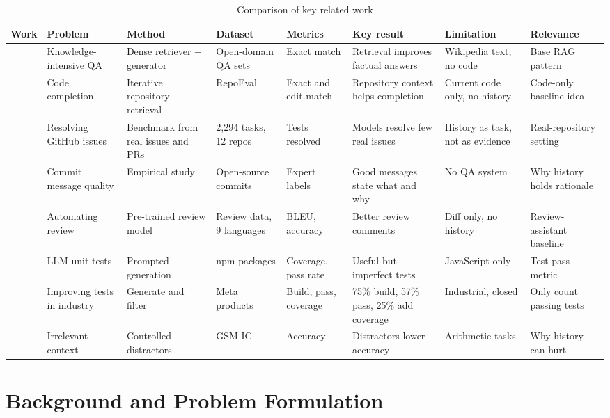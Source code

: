 \documentclass[12pt,onecolumn,draftclsnofoot]{IEEEtran}
\begin{document}
\begin{table}[!t]
\caption{Comparison of key related work}
\label{tab:related}
\centering
\scriptsize
\setlength{\tabcolsep}{3pt}
\begin{tabular}{@{}p{0.9cm}p{1.6cm}p{1.9cm}p{1.7cm}p{1.3cm}p{2.2cm}p{1.9cm}p{1.6cm}@{}}
\toprule
Work & Problem & Method & Dataset & Metrics & Key result & Limitation & Relevance \\
\midrule
\cite{lewis2020rag} & Knowledge-intensive QA & Dense retriever + generator & Open-domain QA sets & Exact match & Retrieval improves factual answers & Wikipedia text, no code & Base RAG pattern \\
\cite{zhang2023repocoder} & Code completion & Iterative repository retrieval & RepoEval & Exact and edit match & Repository context helps completion & Current code only, no history & Code-only baseline idea \\
\cite{jimenez2024swebench} & Resolving GitHub issues & Benchmark from real issues and PRs & 2{,}294 tasks, 12 repos & Tests resolved & Models resolve few real issues & History as task, not as evidence & Real-repository setting \\
\cite{tian2022commit} & Commit message quality & Empirical study & Open-source commits & Expert labels & Good messages state what and why & No QA system & Why history holds rationale \\
\cite{li2022codereviewer} & Automating review & Pre-trained review model & Review data, 9 languages & BLEU, accuracy & Better review comments & Diff only, no history & Review-assistant baseline \\
\cite{schafer2024testpilot} & LLM unit tests & Prompted generation & npm packages & Coverage, pass rate & Useful but imperfect tests & JavaScript only & Test-pass metric \\
\cite{alshahwan2024testgen} & Improving tests in industry & Generate and filter & Meta products & Build, pass, coverage & 75\% build, 57\% pass, 25\% add coverage & Industrial, closed & Only count passing tests \\
\cite{shi2023distracted} & Irrelevant context & Controlled distractors & GSM-IC & Accuracy & Distractors lower accuracy & Arithmetic tasks & Why history can hurt \\
\bottomrule
\end{tabular}
\end{table}

\section{Background and Problem Formulation}
\end{document}
